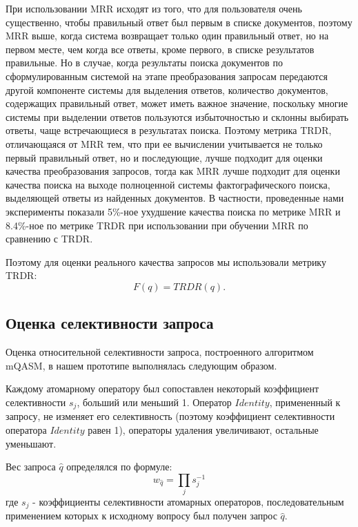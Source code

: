 \documentclass{article}
\begin{document}
При использовании MRR
исходят из того, что для пользователя очень существенно, чтобы правильный ответ
был первым в списке документов, поэтому
MRR выше, когда система возвращает только один
правильный ответ, но на первом месте,
чем когда все ответы, кроме первого, в списке результатов правильные.
Но в случае, когда результаты поиска документов по сформулированным
системой на этапе преобразования запросам
передаются другой компоненте системы для выделения ответов,
количество документов, содержащих правильный ответ,
может иметь важное значение, поскольку многие системы
при выделении ответов пользуются избыточностью и склонны выбирать
ответы, чаще встречающиеся в результатах поиска.
Поэтому метрика TRDR, отличающаяся от MRR тем, что при ее вычислении учитывается
не только первый правильный ответ, но и последующие,
лучше подходит для оценки качества преобразования запросов,
тогда как MRR лучше подходит для оценки качества поиска на выходе
полноценной системы фактографического поиска, выделяющей ответы из
найденных документов.
В частности, проведенные нами эксперименты показали 5\%-ное
ухудшение качества поиска по
метрике MRR и 8.4\%-ное по метрике TRDR при использовании при обучении MRR
по сравнению с TRDR.

Поэтому для оценки реального качества запросов мы использовали метрику TRDR:
$$F(q) = TRDR(q).$$


\subsection{Оценка селективности запроса} \label{selectivity}
Оценка относительной селективности запроса, построенного алгоритмом mQASM,
в нашем прототипе выполнялась следующим образом.

  Каждому атомарному оператору был сопоставлен некоторый
  коэффициент селективности $s_j$, больший или меньший 1. 
  Оператор $Identity$, примененный к запросу, не изменяет
  его селективность (поэтому коэффициент селективности оператора $Identity$ равен 1),
  операторы удаления увеличивают, остальные
  уменьшают.

  Вес запроса $\hat{q}$ определялся по формуле:
  $$w_{\hat{q}}=\prod_j s_j^{-1}$$
  где $s_j$ - коэффициенты селективности атомарных операторов,
  последовательным применением которых к исходному вопросу был получен запрос $\hat{q}$.

\end{document}
